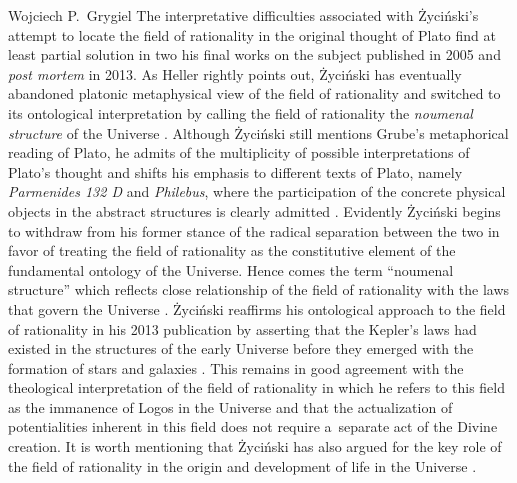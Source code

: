 \begin{artengenv}{Wojciech P.~Grygiel}
The interpretative difficulties associated with Życiński's attempt to locate the field of rationality in the original thought of Plato find at least partial solution in two his final works on the subject published in 2005 and \textit{post mortem} in 2013. As Heller rightly points out, Życiński has eventually abandoned platonic metaphysical view of the field of rationality and switched to its ontological interpretation by calling the field of rationality the \textit{noumenal structure} of the Universe
\parencite[][p.442]{heller_field_2014}. %
 Although Życiński still mentions Grube's metaphorical reading of Plato, he admits of the multiplicity of possible interpretations of Plato's thought and shifts his emphasis to different texts of Plato, namely \textit{Parmenides 132 D} and \textit{Philebus}, where the participation of the concrete physical objects in the abstract structures is clearly admitted 
\parencite[][p.58]{zycinski_pole_2006}. %
 Evidently Życiński begins to withdraw from his former stance of the radical separation between the two in favor of treating the field of rationality as the constitutive element of the fundamental ontology of the Universe. Hence comes the term ``noumenal structure'' which reflects close relationship of the field of rationality with the laws that govern the Universe 
\parencite[][pp.58–59]{zycinski_pole_2006}. %
 Życiński reaffirms his ontological approach to the field of rationality in his 2013 publication by asserting that the Kepler's laws had existed in the structures of the early Universe before they emerged with the formation of stars and galaxies 
\parencite[][p.161]{zycinski_swiat_2013}. %
 This remains in good agreement with the theological interpretation of the field of rationality in which he refers to this field as the immanence of Logos in the Universe 
\parencites[][]{zycinski_pole_2006}[][pp.170–172]{zycinski_swiat_2013} %
 and that the actualization of potentialities inherent in this field does not require a~separate act of the Divine creation. It is worth mentioning that Życiński has also argued for the key role of the field of rationality in the origin and development of life in the Universe 
\parencite[][]{zycinski_wszechswiat_2009}.%



\end{artengenv}
